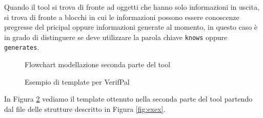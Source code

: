 Quando il tool si trova di fronte ad oggetti che hanno solo informazioni in uscita, si trova di fronte a blocchi in cui le informazioni possono essere conoscenze pregresse del pricipal oppure informazioni generate al momento, in questo caso è in grado di distinguere se deve utilizzare la parola chiave \texttt{knows} oppure \texttt{generates}.  
\newpage 
\begin{figure}[h!] 
    \centering 
    \caption{Flowchart modellazione seconda parte del tool}
    \label{fig:p2} 
\end{figure}
\clearpage
\begin{figure}[h!] 
    
    \caption{Esempio di template per VerifPal}
    \label{fig:extem} 
\end{figure}
\noindent In Figura \ref{fig:extem} vediamo il template ottenuto nella seconda parte del tool partendo dal file delle strutture descritto in Figura \ref{fig:exex}.
